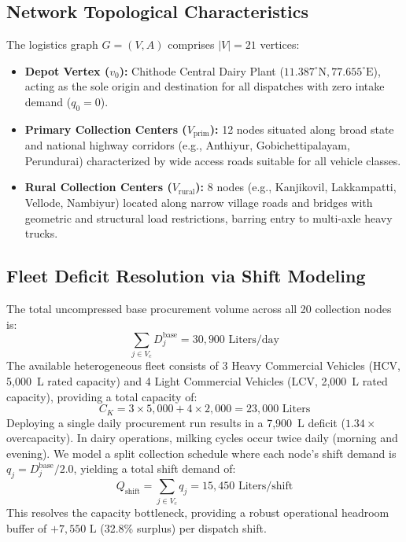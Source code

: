 \documentclass[11pt,a4paper]{article}
\begin{document}
\subsection{Network Topological Characteristics}
The logistics graph $G = (V, A)$ comprises $|V| = 21$ vertices:
\begin{itemize}
    \item \textbf{Depot Vertex ($v_0$):} Chithode Central Dairy Plant ($11.387^\circ\text{N}, 77.655^\circ\text{E}$), acting as the sole origin and destination for all dispatches with zero intake demand ($q_0 = 0$).
    \item \textbf{Primary Collection Centers ($V_{\text{prim}}$):} 12 nodes situated along broad state and national highway corridors (e.g., Anthiyur, Gobichettipalayam, Perundurai) characterized by wide access roads suitable for all vehicle classes.
    \item \textbf{Rural Collection Centers ($V_{\text{rural}}$):} 8 nodes (e.g., Kanjikovil, Lakkampatti, Vellode, Nambiyur) located along narrow village roads and bridges with geometric and structural load restrictions, barring entry to multi-axle heavy trucks.
\end{itemize}

\subsection{Fleet Deficit Resolution via Shift Modeling}
The total uncompressed base procurement volume across all 20 collection nodes is:
\begin{equation}
\sum_{j \in V_c} D_j^{\text{base}} = 30{,}900 \text{ Liters/day}
\end{equation}
The available heterogeneous fleet consists of 3 Heavy Commercial Vehicles (HCV, 5,000~L rated capacity) and 4 Light Commercial Vehicles (LCV, 2,000~L rated capacity), providing a total capacity of:
\begin{equation}
C_{K} = 3 \times 5{,}000 + 4 \times 2{,}000 = 23{,}000 \text{ Liters}
\end{equation}
Deploying a single daily procurement run results in a 7,900~L deficit ($1.34\times$ overcapacity). In dairy operations, milking cycles occur twice daily (morning and evening). We model a split collection schedule where each node's shift demand is $q_j = D_j^{\text{base}} / 2.0$, yielding a total shift demand of:
\begin{equation}
Q_{\text{shift}} = \sum_{j \in V_c} q_j = 15{,}450 \text{ Liters/shift}
\end{equation}
This resolves the capacity bottleneck, providing a robust operational headroom buffer of $+7{,}550\text{ L}$ (32.8\% surplus) per dispatch shift.
\end{document}
